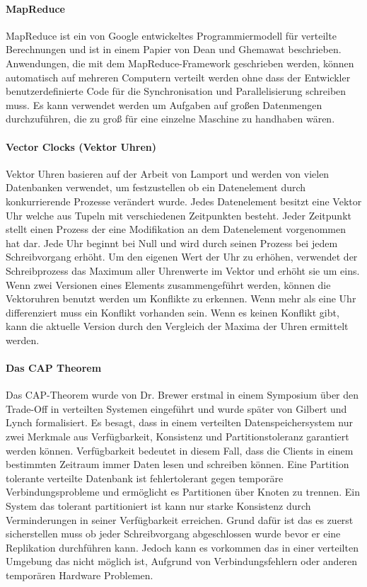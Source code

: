\paragraph{MapReduce} MapReduce ist ein von Google entwickeltes Programmiermodell für verteilte Berechnungen und ist in einem Papier von Dean und Ghemawat \cite{Dean:2008:MSD:1327452.1327492} beschrieben. Anwendungen, die mit dem MapReduce-Framework geschrieben werden, können automatisch auf mehreren Computern verteilt werden ohne dass der Entwickler benutzerdefinierte Code für die Synchronisation und Parallelisierung schreiben muss. Es kann verwendet werden um Aufgaben auf großen Datenmengen durchzuführen, die zu groß für eine einzelne Maschine zu handhaben wären.


\paragraph{Vector Clocks (Vektor Uhren)}
Vektor Uhren basieren auf der Arbeit von Lamport \cite{Lamport:1978:TCO:359545.359563} und werden von vielen Datenbanken verwendet, um festzustellen ob ein Datenelement durch konkurrierende Prozesse verändert wurde. Jedes Datenelement besitzt eine Vektor Uhr welche aus Tupeln mit verschiedenen Zeitpunkten besteht. Jeder Zeitpunkt stellt einen Prozess der eine Modifikation an dem Datenelement vorgenommen hat dar. Jede Uhr beginnt bei Null und wird durch seinen Prozess bei jedem Schreibvorgang erhöht. Um den eigenen Wert der Uhr zu erhöhen, verwendet der Schreibprozess das Maximum aller Uhrenwerte im Vektor und erhöht sie um eins. Wenn zwei Versionen eines Elements zusammengeführt werden, können die Vektoruhren benutzt werden um Konflikte zu erkennen. Wenn mehr als eine Uhr differenziert muss ein Konflikt vorhanden sein. Wenn es keinen Konflikt gibt, kann die aktuelle Version durch den Vergleich der Maxima der Uhren ermittelt werden.

\paragraph{Das CAP Theorem} Das CAP-Theorem wurde von Dr. Brewer erstmal in einem Symposium \cite{cap2010} über den Trade-Off in verteilten Systemen eingeführt und wurde später von Gilbert und Lynch \cite{Gilbert:2002:BCF:564585.564601} formalisiert. Es besagt, dass in einem verteilten Datenspeichersystem nur zwei Merkmale aus Verfügbarkeit, Konsistenz und  Partitionstoleranz garantiert werden können. Verfügbarkeit bedeutet in diesem Fall, dass die Clients in einem bestimmten Zeitraum immer Daten lesen und schreiben können. Eine Partition tolerante verteilte Datenbank ist fehlertolerant gegen temporäre Verbindungsprobleme und ermöglicht es Partitionen über Knoten zu trennen. Ein System das tolerant partitioniert ist kann nur starke Konsistenz durch Verminderungen in seiner Verfügbarkeit erreichen. Grund dafür ist das es zuerst sicherstellen muss ob jeder Schreibvorgang abgeschlossen wurde bevor er eine Replikation durchführen kann. Jedoch kann es vorkommen das in einer verteilten Umgebung das nicht möglich ist, Aufgrund von Verbindungsfehlern oder anderen temporären Hardware Problemen.

